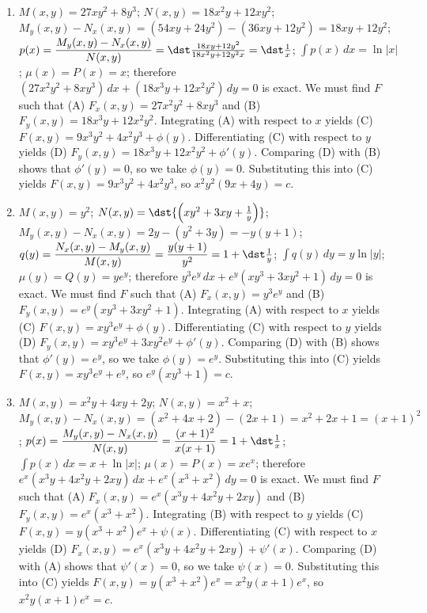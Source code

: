 \documentclass[openany]{book}
\newenvironment{sectionSolutions}{
 \begin{enumerate}[item-label={\thesection.\arabic{enumi}.}]
}{
 \end{enumerate}
}
\begin{document}
\begin{sectionSolutions}
\item
$M(x,y)=27xy^2+8y^3$;\;
$N(x,y)=18x^2y+12xy^2$;\;
$M_y(x,y)-N_x(x,y)=(54xy+24y^2)-(36xy+12y^2)=18xy+12y^2$;\;
$p(x)=\dfrac{M_y(x,y)-N_x(x,y)}{ N(x,y)}=\dst\frac{18xy+12y^2}{
18x^2y+12y^2x}=\dst\frac{1}{ x}$;\;
$\int p(x)\,dx=\ln|x|$;\;
$\mu(x)=P(x)=x$;
therefore
$(27x^2y^2+8xy^3)\,dx+(18x^3y+12x^2y^2)\,dy=0$
is exact.
We must find $F$ such that
(A) $F_x(x,y)=27x^2y^2+8xy^3$ and
(B) $F_y(x,y)=18x^3y+12x^2y^2$.
Integrating (A) with respect to $x$ yields
(C) $F(x,y)=9x^3y^2+4x^2y^3+\phi(y)$.
Differentiating (C) with respect to $y$  yields
(D) $F_y(x,y)=18x^3y+12x^2y^2+\phi'(y)$.
Comparing (D) with (B)  shows that
$\phi'(y)=0$, so we take
$\phi(y)=0$.
Substituting this into (C) yields
$F(x,y)=9x^3y^2+4x^2y^3$,
so $x^2y^2(9x+4y)=c$.

\item
$M(x,y)=y^2$;\;
$N(x,y)= \dst{\left(xy^2+3xy+\frac{1}{ y}\right)}$;\;
$M_y(x,y)-N_x(x,y)=2y-(y^2+3y)=-y(y+1)$;\;
$q(y)=\dfrac{N_x(x,y)-M_y(x,y)}{ M(x,y)}=\dfrac{y(y+1)}{ y^2}=
1+\dst\frac{1}{ y}$;\;
$\int q(y)\,dy=y\ln|y|$;\;
$\mu(y)=Q(y)=ye^y$;
therefore
$y^3e^y\,dx+e^y(xy^3+3xy^2+1)\,dy=0$
is exact.
We must find $F$ such that
(A) $F_x(x,y)=y^3e^y$ and
(B) $F_y(x,y)=e^y(xy^3+3xy^2+1)$.
Integrating (A) with respect to $x$ yields
(C) $F(x,y)=xy^3e^y+\phi(y)$.
Differentiating (C) with respect to $y$  yields
(D) $F_y(x,y)=xy^3e^y+3xy^2e^y+\phi'(y)$.
Comparing (D) with (B)  shows that
$\phi'(y)=e^y$, so we take
$\phi(y)=e^y$.
Substituting this into (C) yields
$F(x,y)=xy^3e^y+e^y$,
so $e^y(xy^3+1)=c$.




\item
$M(x,y)=x^2y+4xy+2y$;\;
$N(x,y)=x^2+x$;\;
$M_y(x,y)-N_x(x,y)=(x^2+4x+2)-(2x+1)=x^2+2x+1=(x+1)^2$;\;
$p(x)=\dfrac{M_y(x,y)-N_x(x,y)}{ N(x,y)}=\dfrac{(x+1)^2}{
x(x+1)}=1+\dst\frac{1}{ x}$;\;
$\int p(x)\,dx=x+\ln|x|$;\;
$\mu(x)=P(x)=xe^x$;
therefore
$e^x(x^3y+4x^2y+2xy)\,dx+e^x(x^3+x^2)\,dy=0$
is exact.
We must find $F$ such that
(A) $F_x(x,y)=e^x(x^3y+4x^2y+2xy)$ and
(B) $F_y(x,y)=e^x(x^3+x^2)$.
Integrating (B) with respect to $y$ yields
(C) $F(x,y)=y(x^3+x^2)e^x+\psi(x)$.
Differentiating (C) with respect to $x$  yields
(D) $F_x(x,y)=e^x(x^3y+4x^2y+2xy)+\psi'(x)$.
Comparing (D) with (A)  shows that
$\psi'(x)=0$, so we take
$\psi(x)=0$.
Substituting this into (C) yields
$F(x,y)=y(x^3+x^2)e^x=x^2y(x+1)e^x$,
so $x^2y(x+1)e^x=c$.




\end{sectionSolutions}
\end{document}
